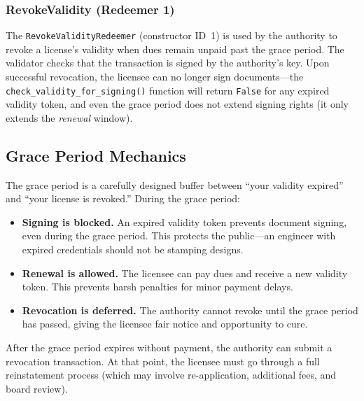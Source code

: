 \subsubsection{RevokeValidity (Redeemer 1)}

The \texttt{RevokeValidityRedeemer} (constructor ID~1) is used by the
authority to revoke a license's validity when dues remain unpaid past
the grace period. The validator checks that the transaction is signed
by the authority's key. Upon successful revocation, the licensee can no
longer sign documents---the \texttt{check\_validity\_for\_signing()}
function will return \texttt{False} for any expired validity token,
and even the grace period does not extend signing rights (it only
extends the \emph{renewal} window).

\subsection{Grace Period Mechanics}

The grace period is a carefully designed buffer between ``your validity
expired'' and ``your license is revoked.'' During the grace period:

\begin{itemize}[nosep]
  \item \textbf{Signing is blocked.} An expired validity token prevents
    document signing, even during the grace period. This protects the
    public---an engineer with expired credentials should not be
    stamping designs.
  \item \textbf{Renewal is allowed.} The licensee can pay dues and
    receive a new validity token. This prevents harsh penalties for
    minor payment delays.
  \item \textbf{Revocation is deferred.} The authority cannot revoke
    until the grace period has passed, giving the licensee fair notice
    and opportunity to cure.
\end{itemize}

After the grace period expires without payment, the authority can submit
a revocation transaction. At that point, the licensee must go through a
full reinstatement process (which may involve re-application, additional
fees, and board review).

